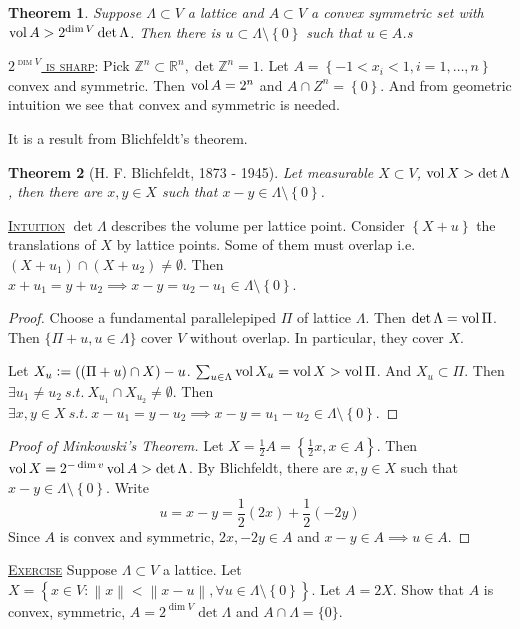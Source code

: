 \documentclass{report}
\newcommand{\R}{\mathbb{R}}
\newcommand{\Z}{\mathbb{Z}}
\newcommand{\st}{\ s.t.\ }
\newcommand{\norm}[1]{\left\| #1 \right\|}
\newcommand{\set}[1]{\left\{ #1 \right\}}
\newcommand{\defeq}{\vcentcolon=}
\newcommand{\fancyem}[1]{\underline{\textsc{#1}}}
\newtheorem{theorem}{Theorem}[section]
\theoremstyle{definition}
\theoremstyle{remark}
\numberwithin{equation}{section}
\begin{document}
\begin{theorem}
    Suppose $\Lambda \subset V$ a lattice and $A \subset V$ a convex symmetric set with $\operatorname{vol} A > 2^{\dim V} \det \Lambda$. Then there is $u \subset \Lambda \setminus \set{0}$ such that $u \in A$.s
\end{theorem}

\fancyem{$2^{\dim V}$ is sharp}: Pick $\Z^n \subset \R^n, \det \Z^n = 1$. Let $A = \set{-1 < x_i < 1,  i = 1, \ldots, n}$ convex and symmetric. Then $\operatorname{vol} A = 2^n$ and $A \cap Z^n = \set{0}$. And from geometric intuition we see that convex and symmetric is needed.

It is a result from Blichfeldt's theorem.
\begin{theorem}[H. F. Blichfeldt, 1873 - 1945]
    Let measurable $X \subset V$, $\operatorname{vol} X > \det \Lambda$, then there are $x, y \in X$ such that $x - y \in \Lambda \setminus \set{0}$.
\end{theorem}

\fancyem{Intuition} $\det \Lambda$ describes the volume per lattice point. Consider $\set{X + u}$ the translations of $X$ by lattice points. Some of them must overlap i.e. $(X + u_1) \cap (X + u_2) \neq \emptyset$. Then $x + u_1 = y + u_2 \implies x - y = u_2 - u_1 \in \Lambda \setminus \set{0}$.

\begin{proof}
    Choose a fundamental parallelepiped $\Pi$ of lattice $\Lambda$. Then $\det \Lambda = \operatorname{vol} \Pi$. Then $\{\Pi + u, u \in \Lambda\}$ cover $V$ without overlap. In particular, they cover $X$.

    Let $X_u \defeq ((\Pi + u) \cap X) - u$. $\sum_{u \in \Lambda} \operatorname{vol} X_u = \operatorname{vol} X > \operatorname{vol} \Pi$. And $X_u \subset \Pi$. Then $\exists u_1 \neq u_2 \st X_{u_1} \cap X_{u_2}\neq \emptyset$. Then $\exists x, y \in X \st x - u_1 = y - u_2 \implies x - y = u_1 - u_2 \in \Lambda \setminus \set{0}$.
\end{proof}

\begin{proof}[Proof of Minkowski's Theorem]
    Let $X = \frac{1}{2}A = \set{\frac{1}{2}x, x \in A}$.
    Then $\operatorname{vol} X = 2^{-\dim v}\operatorname{vol} A > \det \Lambda$. By Blichfeldt, there are $x, y \in X$ such that $x - y \in \Lambda \setminus \set{0}$. Write \[u = x - y = \frac{1}{2}(2x) + \frac{1}{2}(-2y)\]
    Since $A$ is convex and symmetric, $2x, -2y \in A$ and $x - y \in A \implies u \in A$.
\end{proof}

\fancyem{Exercise} Suppose $\Lambda \subset V$ a lattice. Let $X = \set{x \in V: \norm{x} < \norm{x - u}, \forall u \in \Lambda \setminus \set{0}}$. Let $A = 2X$. Show that $A$ is convex, symmetric, $A = 2^{\dim V} \det \Lambda$ and $ A \cap \Lambda = \{0\}$.
\end{document}
